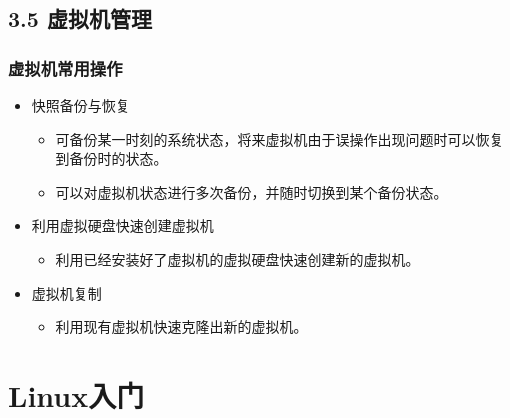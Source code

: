 \documentclass[xcolor=svgnames,presentation]{beamer}
\begin{document}
\subsection{3.5 虚拟机管理}
\label{sec-3-5}
\begin{frame}
\frametitle{虚拟机常用操作}
\label{sec-3-5-1}
\begin{itemize}

\item 快照备份与恢复
\label{sec-3-5-1-1}%
\begin{itemize}

\item 可备份某一时刻的系统状态，将来虚拟机由于误操作出现问题时可以恢复到备份时的状态。
\label{sec-3-5-1-1-1}%

\item 可以对虚拟机状态进行多次备份，并随时切换到某个备份状态。
\label{sec-3-5-1-1-2}%
\end{itemize} %

\item 利用虚拟硬盘快速创建虚拟机
\label{sec-3-5-1-2}%
\begin{itemize}

\item 利用已经安装好了虚拟机的虚拟硬盘快速创建新的虚拟机。
\label{sec-3-5-1-2-1}%
\end{itemize} %

\item 虚拟机复制
\label{sec-3-5-1-3}%
\begin{itemize}

\item 利用现有虚拟机快速克隆出新的虚拟机。
\label{sec-3-5-1-3-1}%
\end{itemize} %
\end{itemize} %
\end{frame}
\section{Linux入门}
\label{sec-4}
\end{document}
